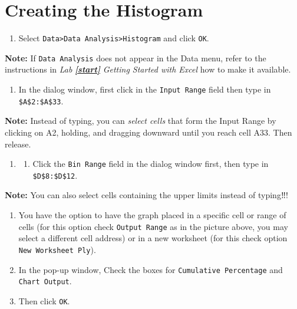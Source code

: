 \documentclass[
  12pt,
  letterpaper,
]{book}
\providecommand{\tightlist}{%
  \setlength{\itemsep}{0pt}\setlength{\parskip}{0pt}}
\begin{document}
\hypertarget{creating-the-histogram}{%
\section{Creating the Histogram}\label{creating-the-histogram}}

\begin{enumerate}
\def\labelenumi{\arabic{enumi}.}
\tightlist
\item
  Select \texttt{Data\textgreater{}Data\ Analysis\textgreater{}Histogram} and click \texttt{OK}.
\end{enumerate}

\textbf{Note:} If \texttt{Data\ Analysis} does not appear in the Data menu, refer to the instructions in \emph{Lab} \textbf{\emph{\ref{start}}} \emph{Getting Started with Excel} how to make it available.

\begin{enumerate}
\def\labelenumi{\arabic{enumi}.}
\setcounter{enumi}{1}
\tightlist
\item
  In the dialog window, first click in the \texttt{Input\ Range} field then type in \texttt{\$A\$2:\$A\$33}.
\end{enumerate}

\textbf{Note:} Instead of typing, you can \emph{select cells} that form the Input Range by clicking on A2, holding, and dragging downward until you reach cell A33. Then release.

\begin{enumerate}
\def\labelenumi{\arabic{enumi}.}
\setcounter{enumi}{2}
\item
  \begin{enumerate}
  \def\labelenumii{\arabic{enumii})}
  \setcounter{enumii}{2}
  \tightlist
  \item
    Click the \texttt{Bin\ Range} field in the dialog window first, then type in \texttt{\$D\$8:\$D\$12}.
  \end{enumerate}
\end{enumerate}

\textbf{Note:} You can also select cells containing the upper limits instead of typing‼!

\begin{enumerate}
\def\labelenumi{\arabic{enumi}.}
\setcounter{enumi}{3}
\tightlist
\item
  You have the option to have the graph placed in a specific cell or range of cells (for this option check \texttt{Output\ Range} as in the picture above, you may select a different cell address) or in a new worksheet (for this check option \texttt{New\ Worksheet\ Ply}).
\item
  In the pop-up window, Check the boxes for \texttt{Cumulative\ Percentage} and \texttt{Chart\ Output}.
\item
  Then click \texttt{OK}.
\end{enumerate}
\end{document}
